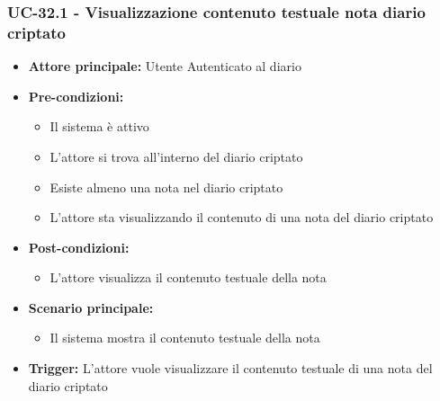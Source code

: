 \documentclass[a4paper,12pt]{article}
\begin{document}
\subsubsection{UC-32.1 - Visualizzazione contenuto testuale nota diario criptato} \label{subsec:UC-32.1}
\begin{itemize}
    \item \textbf{Attore principale:} Utente Autenticato al diario
    \item \textbf{Pre-condizioni:}
    \begin{itemize}
        \item Il sistema è attivo
        \item L'attore si trova all'interno del diario criptato
        \item Esiste almeno una nota nel diario criptato
        \item L'attore sta visualizzando il contenuto di una nota del diario criptato
    \end{itemize}
    \item \textbf{Post-condizioni:}
    \begin{itemize}
        \item L'attore visualizza il contenuto testuale della nota
    \end{itemize}
    \item \textbf{Scenario principale:}
    \begin{itemize}
        \item Il sistema mostra il contenuto testuale della nota 
    \end{itemize}
    \item \textbf{Trigger:} L'attore vuole visualizzare il contenuto testuale di una nota del diario criptato
\end{itemize}
\end{document}
